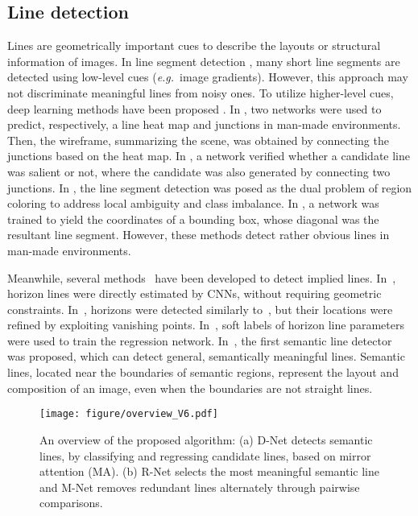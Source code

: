\documentclass[runningheads]{llncs}
\newcommand{\eg}{\textit{e.g.}}
\begin{document}
\subsection{Line detection}
Lines are geometrically important cues to describe the layouts or structural information of images. In line segment detection \cite{matas2000,von2008,desolneux200,akinlar2011}, many short line segments are detected using low-level cues (\eg~image gradients). However, this approach  may not discriminate meaningful lines from noisy ones. To utilize higher-level cues, deep learning methods have been proposed \cite{huang2018,xue2019,zhou2019_line,sun2019}.
In \cite{huang2018}, two networks were used to predict, respectively, a line heat map and junctions in man-made environments. Then, the wireframe, summarizing the scene, was obtained by connecting the junctions based on the heat map. In \cite{zhou2019_line}, a network verified whether a candidate line was salient or not, where the candidate was also generated by connecting two junctions. In \cite{xue2019}, the line segment detection was posed as the dual problem of region coloring to address local ambiguity and class imbalance. In \cite{sun2019}, a network was trained to yield the coordinates of a bounding box, whose diagonal was the resultant line segment. However, these methods \cite{huang2018,xue2019,zhou2019_line,sun2019} detect rather obvious lines in man-made environments.

Meanwhile, several methods~\cite{workman2016,zhai2016,lee2017,diaz2019} have been developed to detect implied lines. In~\cite{workman2016}, horizon lines were directly estimated by CNNs, without requiring geometric constraints. In~\cite{zhai2016}, horizons were detected similarly to~\cite{workman2016}, but their locations were refined by exploiting vanishing points. In~\cite{diaz2019}, soft labels of horizon line parameters were used to train the regression network. In~\cite{lee2017}, the first semantic line detector was proposed, which can detect general, semantically meaningful lines. Semantic lines, located near the boundaries of semantic regions, represent the layout and composition of an image, even when the boundaries are not straight lines.


\begin{figure*}[t]

  \centering
  \texttt{[image: figure/overview\_V6.pdf]}
  \caption{An overview of the proposed algorithm: (a) D-Net detects semantic lines, by classifying and regressing candidate lines, based on mirror attention (MA). (b) R-Net selects the most meaningful semantic line and M-Net removes redundant lines alternately through pairwise comparisons.}
  \label{fig:overview_fig}

\end{figure*}
\end{document}
